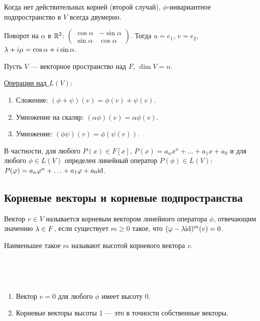 \begin{Task}
Когда нет действительных корней (второй случай), $\phi$-инвариантное подпространство в $V$ всегда двумерно.
\end{Task}

\begin{Examples}
Поворот на $\alpha$ в $\mathbb{R}^2$: $
\begin{pmatrix}
\cos \alpha & -\sin \alpha \\
\sin \alpha & \cos \alpha  
\end{pmatrix}
$. Тогда $u = e_1$, $v = e_2$, $\lambda + i\mu = \cos \alpha + i\sin \alpha$.
\end{Examples}

Пусть $V$ --- векторное пространство над $F$, $\dim V = n$.

\vspace{0.2cm}
\underline{Операции над $L(V)$}:
\begin{enumerate}
\item Сложение: $(\phi + \psi)(v) = \phi(v) + \psi(v)$.
\item Умножение на скаляр: $(\alpha\phi)(v) = \alpha\phi(v)$.
\item Умножение: $(\phi\psi)(v) = \phi(\psi(v))$.
\end{enumerate}
В частности, для любого $P(x) \in F[x]$, $P(x) = a_nx^n + \ldots + a_1x + a_0$ и для любого $\phi \in L(V)$ определен линейный оператор $P(\phi)\in L(V)$: $P(\varphi) = a_n \varphi^n + \ldots + a_1\varphi + a_0\mathrm{id}$.

\subsection*{Корневые векторы и корневые подпространства}

\begin{Def}
Вектор $v \in V$ называется корневым вектором линейного оператора $\phi$, отвечающим значению $\lambda \in F$, если существует $m \geqslant 0$ такое, что $(\varphi - \lambda\mathrm{id})^m(v) = 0$.

Наименьшее такое $m$ называют высотой корневого вектора $v$.
\end{Def}
\ \\
\begin{Comment}\
\begin{enumerate}
\item Вектор $v = 0$ для любого $\phi$ имеет высоту 0.
\item Корневые векторы высоты 1 --- это в точности собственные векторы.
\end{enumerate}
\end{Comment}


